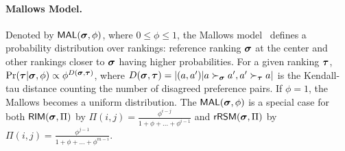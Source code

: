 \paragraph{Mallows Model.}

Denoted by $\mathsf{MAL}(\bm{\sigma}, \phi)$, where $0 \leq \phi \leq 1$, the Mallows model~\cite{Mallows1957} defines a probability distribution over rankings: reference ranking $\bm{\sigma}$ at the center and other rankings closer to $\bm{\sigma}$ having higher probabilities.
For a given ranking $\bm{\tau}$, $\Pr(\bm{\tau}|\bm{\sigma}, \phi) \propto \phi^{D(\bm{\sigma}, \bm{\tau})}$, where $D(\bm{\sigma}, \bm{\tau}) = |{(a, a') | a \succ_{\bm{\sigma}} a', a' \succ_{\bm{\tau}} a}|$ is the Kendall-tau distance counting the number of disagreed preference pairs.
If $\phi=1$, the Mallows becomes a uniform distribution.
The $\mathsf{MAL}(\bm{\sigma}, \phi)$ is a special case for both $\mathsf{RIM}(\bm{\sigma}, \Pi)$ by $\Pi(i, j) = \frac{\phi^{i-j}}{1+\phi+...+\phi^{i-1}}$ and $\mathsf{rRSM}(\bm{\sigma}, \Pi)$ by $\Pi(i, j) = \frac{\phi^{j-1}}{1+\phi+...+\phi^{m-i}}$.
